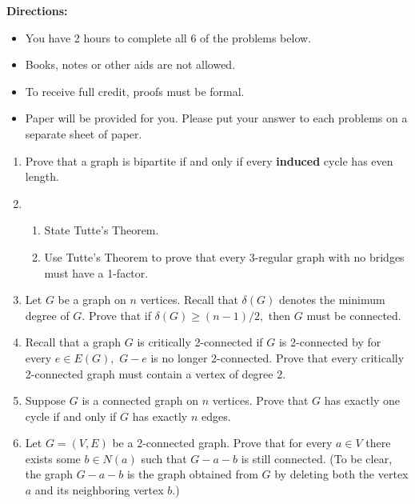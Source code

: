 \documentclass[12pt]{article}
\renewcommand{\emph}[1]{\textsf{\textbf{#1}}}
\begin{document}
\textbf{Directions:} 
\begin{itemize}
	\item You have 2 hours to complete all 6 of the problems below. 
	\item Books, notes or other aids are not allowed. 
	\item To receive full credit, proofs must be formal.
	\item Paper will be provided for you. Please put your answer to each problems on a separate sheet of paper.
\end{itemize}

\hrulefill

\begin{enumerate}
\item Prove that a graph is bipartite if and only if every \emph{induced} cycle has even length.
\item 
	\begin{enumerate}
	\item State Tutte's Theorem.
	\item Use Tutte's Theorem to prove that every 3-regular graph with no bridges must have a 1-factor.
	\end{enumerate}
\item Let $G$ be a graph on $n$ vertices. Recall that $\delta(G)$ denotes the minimum degree of $G.$ Prove that if  $\delta(G) \geq (n-1)/2,$ then $G$ must be connected. 
\item Recall that a graph $G$ is critically 2-connected if $G$ is 2-connected by for every $e \in E(G),$ $G-e$ is no longer 2-connected. Prove that every critically 2-connected graph must contain a vertex of degree 2.
\item Suppose $G$ is a connected graph on $n$ vertices. Prove that $G$ has exactly one cycle if and only if $G$ has exactly $n$ edges.
\item Let $G=(V,E)$ be a 2-connected graph. Prove that for every $a \in V$ there exists some $b \in N(a)$ such that $G-a-b$ is still connected. (To be clear, the graph $G-a-b$ is the graph obtained from $G$ by deleting both the vertex $a$ and its neighboring vertex $b.$)
\end{enumerate}
\end{document}
